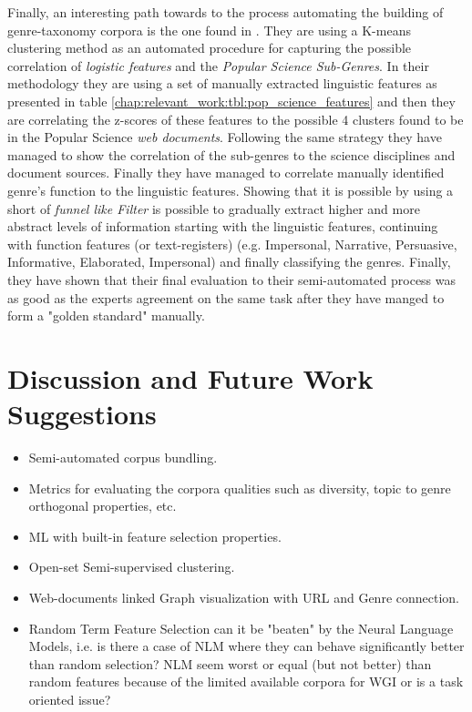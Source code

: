 Finally, an interesting path towards to the process automating the building of genre-taxonomy corpora is the one found in \parencite{lieungnapar2017genre}. They are using a K-means clustering method as an automated procedure for capturing the possible correlation of \textit{logistic features} and the \textit{Popular Science Sub-Genres}. In their methodology they are using a set of manually extracted linguistic features as presented in table \ref{chap:relevant_work:tbl:pop_science_features} and then they are correlating the z-scores of these features to the possible 4 clusters found to be in the Popular Science \textit{web documents}. Following the same strategy they have managed to show the correlation of the sub-genres to the science disciplines and document sources. Finally they have managed to correlate manually identified genre's function to the linguistic features. Showing that it is possible by using a short of \textit{funnel like Filter} is possible to gradually extract higher and more abstract levels of information starting with the linguistic features, continuing with function features (or text-registers) (e.g. Impersonal, Narrative, Persuasive, Informative, Elaborated, Impersonal) and finally classifying the genres. Finally, they have shown that their final evaluation to their semi-automated process was as good as the experts agreement on the same task after they have manged to form a "golden standard" manually. 


\section{Discussion and Future Work Suggestions}\label{chap:relevant_work:sec:intro}

\begin{itemize}
\item Semi-automated corpus bundling.
\item Metrics for evaluating the corpora qualities such as diversity, topic to genre orthogonal properties, etc.
\item ML with built-in feature selection properties.
\item Open-set Semi-supervised clustering.
\item Web-documents linked Graph visualization with URL and Genre connection.
\item Random Term Feature Selection can it be "beaten" by the Neural Language Models, i.e. is there a case of NLM where they can behave significantly better than random selection? NLM seem worst or equal (but not better) than random features because of the limited available corpora for WGI or is a task oriented issue?
\end{itemize}

























